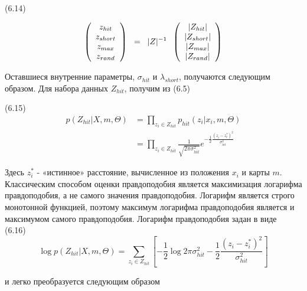 \documentclass[10pt,a4paper]{article}
\begin{document}
(6.14)
\begin{minipage}{0.3\textwidth}
	\begin{equation*}
	\left(\begin{array}{c}
	z_{hit}\\
	z_{short}\\
	z_{max}\\
	z_{rand}\\
	\end{array}\right)
	\hspace{2mm}
	=
	\hspace{2mm}
	|Z|^{-1}
	\hspace{2mm}\left(\begin{array}{c}
	|Z_{hit}|\\
	|Z_{short}|\\
	|Z_{max}|\\
	|Z_{rand}|\\
	\end{array}\right)
	\end{equation*}
\end{minipage}

Оставшиеся внутренние параметры, $\sigma_{hit}$ и $\lambda_{short}$, получаются следующим образом.
Для набора данных $Z_{hit}$, получим из (6.5)

(6.15)
\begin{equation*}
\begin{split}
p(Z_{hit}|X,m,\varTheta)&=\prod_{z_i\in Z_{hit}}p_{hit}(z_i|x_i,m,\varTheta)\\
&=\prod_{z_i\in Z_{hit}}\frac{1}{\sqrt{2\pi\sigma_{hit}^2}}e^{-\frac{1}{2}\frac{(z_i-z_t^*)^2}{\sigma_{hit}^2}}
\end{split}
\end{equation*}

Здесь $z_i^*$ - «истинное» расстояние, вычисленное из положения $x_i$ и карты $m$. Классическим способом оценки правдоподобия является максимизация логарифма правдоподобия, а не самого значения правдоподобия. Логарифм является строго монотонной функцией, поэтому максимум логарифма правдоподобия является и максимумом самого правдоподобия. Логарифм правдоподобия задан в виде\\

(6.16)
$$\log p(Z_{hit}|X,m,\varTheta)=\sum_{z_i\in Z_{hit}}\left[ -\frac{1}{2}\log2\pi\sigma_{hit}^2-\frac{1}{2}\frac{(z_i-z_i^*)^2}{\sigma_{hit}^2}\right] $$

и легко преобразуется следующим образом\\
\end{document}
